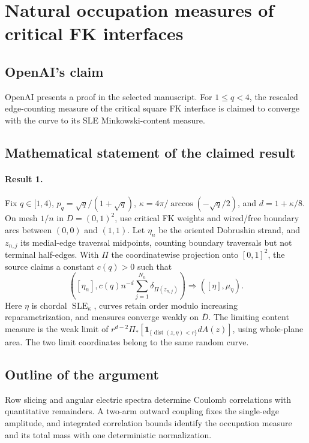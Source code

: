 \documentclass[11pt]{article}
\begin{document}
\section*{Natural occupation measures of critical FK interfaces}

\subsection{OpenAI's claim}
OpenAI presents a proof in the selected manuscript. For $1\leq q<4$, the rescaled edge-counting measure of the critical square FK interface is claimed to converge with the curve to its SLE Minkowski-content measure.

\subsection{Mathematical statement of the claimed result}
\paragraph{Result 1.} Fix \(q\in[1,4)\), \(p_q=\sqrt q/(1+\sqrt q)\), \(\kappa=4\pi/\arccos(-\sqrt q/2)\), and \(d=1+\kappa/8\). On mesh \(1/n\) in \(D=(0,1)^2\), use critical FK weights and wired/free boundary arcs between \((0,0)\) and \((1,1)\). Let \(\eta_n\) be the oriented Dobrushin strand, and \(z_{n,j}\) its medial-edge traversal midpoints, counting boundary traversals but not terminal half-edges. With \(\Pi\) the coordinatewise projection onto \([0,1]^2\), the source claims a constant \(c(q)>0\) such that
\[
 ([\eta_n],c(q)n^{-d}\sum_{j=1}^{N_n}\delta_{\Pi(z_{n,j})})
 \Longrightarrow([\eta],\mu_\eta).
\]
Here \(\eta\) is chordal \(\operatorname{SLE}_\kappa\), curves retain order modulo increasing reparametrization, and measures converge weakly on \(\overline D\). The limiting content measure is the weak limit of \(r^{d-2}\Pi_*[\mathbf1_{\{\operatorname{dist}(z,\eta)<r\}}dA(z)]\), using whole-plane area. The two limit coordinates belong to the same random curve.

\subsection{Outline of the argument}
Row slicing and angular electric spectra determine Coulomb correlations with quantitative remainders. A two-arm outward coupling fixes the single-edge amplitude, and integrated correlation bounds identify the occupation measure and its total mass with one deterministic normalization.
\end{document}
